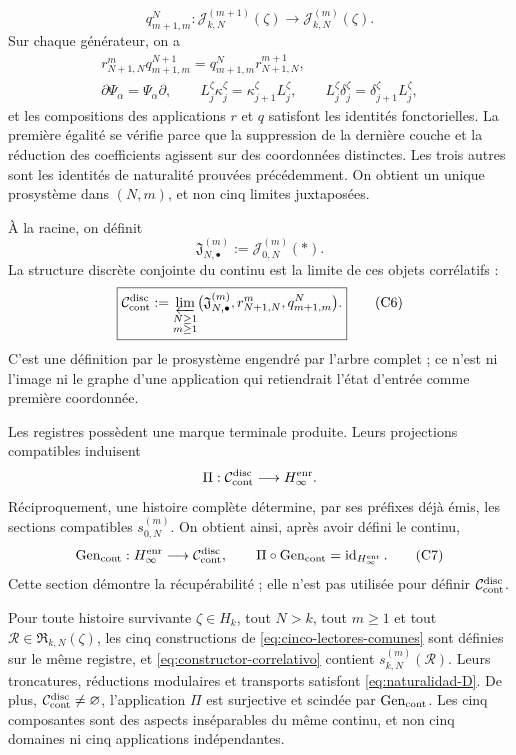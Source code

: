 \[
 q^N_{m+1,m}:\mathcal J_{k,N}^{(m+1)}(\zeta)
 \longrightarrow\mathcal J_{k,N}^{(m)}(\zeta).
\]
Sur chaque générateur, on a
\[
\begin{gathered}
 r^m_{N+1,N}q^{N+1}_{m+1,m}
 =q^N_{m+1,m}r^{m+1}_{N+1,N},\\
 \partial\Psi_\alpha=\Psi_\alpha\partial,
 \qquad L_j^\zeta\kappa_j^\zeta
       =\kappa_{j+1}^\zeta L_j^\zeta,
 \qquad L_j^\zeta\delta_j^\zeta
       =\delta_{j+1}^\zeta L_j^\zeta,
\end{gathered}
\tag{C4}
\label{eq:naturalidad-D}
\]
et les compositions des applications \(r\) et \(q\) satisfont les identités
fonctorielles. La première égalité se vérifie parce que la suppression de la dernière couche et
la réduction des coefficients agissent sur des coordonnées distinctes. Les trois autres
sont les identités de naturalité prouvées précédemment. On obtient un unique
prosystème dans \((N,m)\), et non cinq limites juxtaposées.

À la racine, on définit
\[
 \mathfrak J_{N,\bullet}^{(m)}:=\mathcal J_{0,N}^{(m)}(\ast).
\tag{C5}
\label{eq:fibras-conjuntas-horizonte}
\]
La structure discrète conjointe du continu est la limite de ces objets corrélatifs :
\[
 \boxed{
 \mathcal C_{\rm cont}^{\rm disc}
 :=\varprojlim_{\substack{N\geq1\\m\geq1}}
   \bigl(\mathfrak J_{N,\bullet}^{(m)},
         r^m_{N+1,N},q^N_{m+1,m}\bigr).}
\tag{C6}
\label{eq:continuo-discreto}
\]
C'est une définition par le prosystème engendré par l'arbre complet ; ce n'est
ni l'image ni le graphe d'une application qui retiendrait l'état d'entrée comme
première coordonnée.

Les registres possèdent une marque terminale produite. Leurs projections compatibles induisent
\[
 \Pi:\mathcal C_{\rm cont}^{\rm disc}\longrightarrow H_\infty^{\rm enr}.
\]
Réciproquement, une histoire complète détermine, par ses préfixes déjà émis, les sections compatibles \(s_{0,N}^{(m)}\). On obtient ainsi, après avoir défini le continu,
\[
 \operatorname{Gen}_{\rm cont}:H_\infty^{\rm enr}
 \longrightarrow\mathcal C_{\rm cont}^{\rm disc},
 \qquad
 \Pi\circ\operatorname{Gen}_{\rm cont}
 =\operatorname{id}_{H_\infty^{\rm enr}}.
\tag{C7}
\label{eq:seccion-historias-continuo}
\]
Cette section démontre la récupérabilité ; elle n'est pas utilisée pour définir
\(\mathcal C_{\rm cont}^{\rm disc}\).

\begin{theorem}
\label{thm:correlacion-cinco}
Pour toute histoire survivante \(\zeta\in H_k\), tout \(N>k\), tout
\(m\geq1\) et tout \(\mathscr R\in\mathfrak R_{k,N}(\zeta)\), les cinq
constructions de \eqref{eq:cinco-lectores-comunes} sont définies sur le
même registre, et \eqref{eq:constructor-correlativo} contient
\(s_{k,N}^{(m)}(\mathscr R)\). Leurs troncatures, réductions modulaires et
transports satisfont \eqref{eq:naturalidad-D}. De plus,
\(\mathcal C_{\rm cont}^{\rm disc}\neq\varnothing\), l'application \(\Pi\)
est surjective et scindée par \(\operatorname{Gen}_{\rm cont}\). Les
cinq composantes sont des aspects inséparables du même continu, et non cinq
domaines ni cinq applications indépendantes.
\end{theorem}

